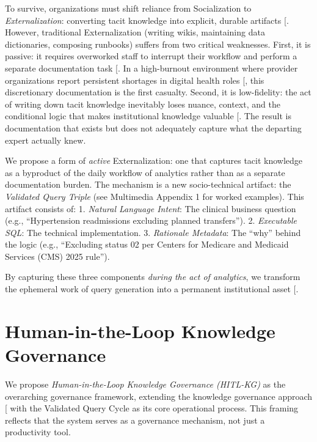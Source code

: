 \documentclass[
  american,
  11pt,
  letterpaper,
  oneside  ,captions=tableheading
]{scrartcl}
\begin{document}
To survive, organizations must shift reliance from Socialization to
\emph{Externalization}: converting tacit knowledge into explicit,
durable artifacts {[}\citeproc{ref-zhang2025}{24}{]}. However,
traditional Externalization (writing wikis, maintaining data
dictionaries, composing runbooks) suffers from two critical weaknesses.
First, it is passive: it requires overworked staff to interrupt their
workflow and perform a separate documentation task
{[}\citeproc{ref-goffin2011}{25}{]}. In a high-burnout environment where
provider organizations report persistent shortages in digital health
roles {[}\citeproc{ref-himssworkforce2024}{6}{]}, this discretionary
documentation is the first casualty. Second, it is low-fidelity: the act
of writing down tacit knowledge inevitably loses nuance, context, and
the conditional logic that makes institutional knowledge valuable
{[}\citeproc{ref-foos2006}{18}{]}. The result is documentation that
exists but does not adequately capture what the departing expert
actually knew.

We propose a form of \emph{active} Externalization: one that captures
tacit knowledge as a byproduct of the daily workflow of analytics rather
than as a separate documentation burden. The mechanism is a new
socio-technical artifact: the \emph{Validated Query Triple} (see
Multimedia Appendix 1 for worked examples). This artifact consists of:
1. \emph{Natural Language Intent}: The clinical business question (e.g.,
``Hypertension readmissions excluding planned transfers''). 2.
\emph{Executable SQL}: The technical implementation. 3. \emph{Rationale
Metadata}: The ``why'' behind the logic (e.g., ``Excluding status 02 per
Centers for Medicare and Medicaid Services (CMS) 2025 rule'').

By capturing these three components \emph{during the act of analytics},
we transform the ephemeral work of query generation into a permanent
institutional asset {[}\citeproc{ref-moore2018}{26}{]}.

\section{Human-in-the-Loop Knowledge
Governance}\label{human-in-the-loop-knowledge-governance}

We propose \emph{Human-in-the-Loop Knowledge Governance (HITL-KG)} as
the overarching governance framework, extending the knowledge governance
approach {[}\citeproc{ref-foss2007}{27}{]} with the Validated Query
Cycle as its core operational process. This framing reflects that the
system serves as a governance mechanism, not just a productivity tool.
\end{document}
